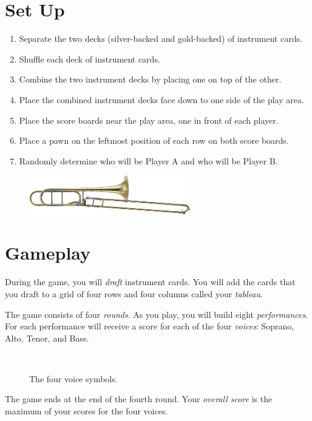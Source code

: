 \documentclass[a6paper, 12pt, parskip=half, DIV=14]{scrartcl}
\begin{document}
\section*{Set Up}
\begin{enumerate}[leftmargin=4ex]
  \item Separate the two decks (silver-backed and gold-backed) of instrument cards. 
  \item Shuffle each deck of instrument cards.
  \item Combine the two instrument decks by placing one on top of the other.
  \item Place the combined instrument decks face down to one side of the play area.
  \item Place the score boards near the play area, one in front of each player.
  \item Place a pawn on the leftmost position of each row on both score boards. 
  \item Randomly determine who will be Player A and who will be Player B.
\end{enumerate}

\vspace{0.5cm}

\begin{figure}[h]
\centering
\includegraphics[width=7cm]{Images/shutterstock_trombone.jpg}
\end{figure}


\newpage
\enlargethispage{1.75\baselineskip}
\section*{Gameplay}
During the game, you will \emph{draft} instrument cards. You will add the cards that you draft to a grid of four rows and four columns called your \emph{tableau}.

The game consists of four \emph{rounds}. As you play, you will build eight \emph{performances}.
For each performance will receive a score for each of the four \emph{voices}: Soprano, Alto, Tenor, and Bass.
{

\begin{figure}[h]
\centering
\Huge
{} \ \  \ \  \ \ 
\caption*{The four voice symbols.}
\end{figure}
}
The game ends at the end of the fourth round. Your \emph{overall score} is the maximum of your scores for the four voices.
\end{document}
